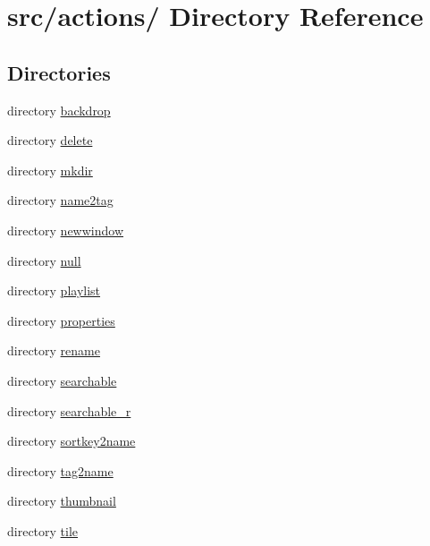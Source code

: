 \hypertarget{dir_000010}{
\section{src/actions/ Directory Reference}
\label{dir_000010}
}
\subsection*{Directories}
\begin{CompactItemize}
\item 
directory \hyperlink{dir_000011}{backdrop}
\item 
directory \hyperlink{dir_000016}{delete}
\item 
directory \hyperlink{dir_000032}{mkdir}
\item 
directory \hyperlink{dir_000034}{name2tag}
\item 
directory \hyperlink{dir_000035}{newwindow}
\item 
directory \hyperlink{dir_000036}{null}
\item 
directory \hyperlink{dir_000037}{playlist}
\item 
directory \hyperlink{dir_000030}{properties}
\item 
directory \hyperlink{dir_000038}{rename}
\item 
directory \hyperlink{dir_000039}{searchable}
\item 
directory \hyperlink{dir_000040}{searchable\_\-r}
\item 
directory \hyperlink{dir_000041}{sortkey2name}
\item 
directory \hyperlink{dir_000042}{tag2name}
\item 
directory \hyperlink{dir_000044}{thumbnail}
\item 
directory \hyperlink{dir_000045}{tile}
\end{CompactItemize}
